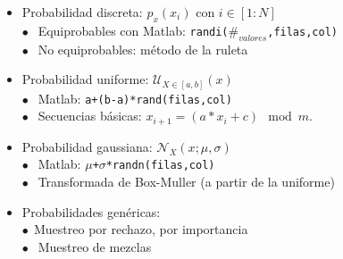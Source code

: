 \documentclass{beamer}
\numberwithin{section}{part}
\begin{document}
\begin{frame}
\begin{itemize}
\begin{itemize}
      \begin{itemize}\scriptsize
        \item Probabilidad \alert{discreta}: \color{blue}$p_x(x_i)$ con $i\in [1:N]$\color{black}\\\scriptsize
        \color{blue}$\bullet\:\:$\color{black} Equiprobables con Matlab: \color{blue}\texttt{randi($\#_{valores}$,filas,col)}\color{black}\\
        \color{blue}$\bullet\:\:$\color{black} No equiprobables: método de la ruleta
        \item Probabilidad \alert{uniforme}: \color{blue}$\mathcal{U}_{X\in [a,b]}(x)$\color{black}\\\scriptsize
        \color{blue}$\bullet\:\:$\color{black} Matlab: \color{blue}\texttt{a+(b-a)*rand(filas,col)}\color{black}\\
        \color{blue}$\bullet\:\:$\color{black} Secuencias básicas: $x_{i+1}=(a*x_i+c)\mod m$.
        \hspace{3.2cm}\color{black}
        \item Probabilidad \alert{gaussiana}: \color{blue}$\mathcal{N}_{X}(x;\mu,\sigma)$\color{black}\\\scriptsize
        \color{blue}$\bullet\:\:$\color{black} Matlab: \color{blue}\texttt{$\mu$+$\sigma$*randn(filas,col)}\color{black}\\
        \color{blue}$\bullet\:\:$\color{black} Transformada de Box-Muller (a partir de la uniforme)
        \item Probabilidades \alert{genéricas}:\\\scriptsize
        \color{blue}$\bullet\:\:$\color{black}Muestreo por rechazo, por importancia\\
        \color{blue}$\bullet\:\:$\color{black} Muestreo de mezclas
      \end{itemize}
    \end{itemize}
  \end{itemize}
\end{frame}
  
\end{document}
